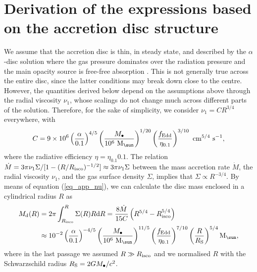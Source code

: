 \documentclass[a4paper,fleqn,usenatbib]{mnras}
\begin{document}





\appendix

\section{Derivation of the expressions based on the accretion disc structure} \label{appendix_formulae}

We assume that the accretion disc is thin, in steady state, and described by the $\alpha$-disc solution where the gas pressure dominates over the radiation pressure and the main opacity source is free-free absorption \citep{shakura+73}.
This is not generally true across the entire disc, since the latter conditions may break down close to the centre.
However, the quantities derived below depend on the assumptions above through the radial viscosity $\nu_{1}$, whose scalings do not change much across different parts of the solution.
Therefore, for the sake of simplicity, we consider $\nu_{1} = C R^{3/4}$ everywhere, with \citep{frank+02,perego+09}
\begin{equation}\label{eq_app_nu}
C = 9 \times 10^{6} \left( \frac{\alpha}{0.1} \right)^{4/5} \left( \frac{M_{\bullet}}{10^6~{\rm M}_{\sun}} \right)^{1/20} \left( \frac{f_{\rm Edd}}{\eta_{0.1}} \right)^{3/10}~{\rm cm^{5/4}~s^{-1}},
\end{equation}
where the radiative efficiency $\eta = \eta_{0.1} 0.1$.
The relation $\dot{M} = 3 \pi \nu_{1} \Sigma / [1 - (R/R_{\rm isco})^{-1/2}] \approx 3 \pi \nu_{1} \Sigma$ between the mass accretion rate $\dot{M}$, the radial viscosity $\nu_{1}$, and the gas surface density $\Sigma$, implies that $\Sigma \propto R^{-3/4}$.
By means of equation (\ref{eq_app_nu}), we can calculate the disc mass enclosed in a cylindrical radius $R$ as
\begin{equation} \label{eq_app_md}
\begin{aligned}
M_{\rm d}(R) & = 2 \pi \int_{R_{\rm isco}}^{R} \Sigma(R) R {\rm d}R = \frac{8 \dot{M}}{15 C} \left( R^{5/4} - R_{\rm isco}^{5/4} \right) \\
& \approx 10^{-2} \left( \frac{\alpha}{0.1} \right)^{-4/5} \left( \frac{M_{\bullet}}{10^6~{\rm M}_{\sun}} \right)^{11/5} \left( \frac{f_{\rm Edd}}{\eta_{0.1}} \right)^{7/10} \left( \frac{R}{R_{\rm S}} \right)^{5/4} {\rm M_{\sun}},
\end{aligned}
\end{equation}
where in the last passage we assumed $R \gg R_{\rm isco}$ and we normalised $R$ with the Schwarzschild radius $R_{\rm S} = 2 G M_{\bullet} / c^2$.
\end{document}
